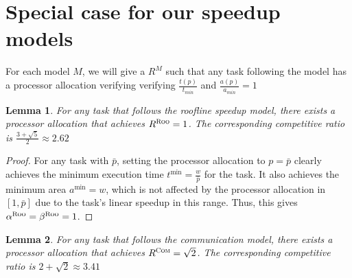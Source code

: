 \documentclass{article}
\newtheorem{lemma}{Lemma}
\newcommand\ratio{R\xspace}
\newcommand\ROO{\textsc{Roo}\xspace}
\newcommand\COM{\textsc{Com}\xspace}
\begin{document}
\section{Special case for our speedup models}

For each model $M$, we will give a $\ratio^M$ such that any task following the model has a processor allocation verifying verifying $\frac{t(p)}{t_{min}}$ and $\frac{a(p)}{a_{min}}=1$

\begin{lemma}\label{lem.roofline}
For any task that follows the roofline speedup model, there exists a processor allocation that achieves $R^{\ROO}=1$. The corresponding competitive ratio is $\frac{3+\sqrt{5}}{2} \approx 2.62$
\end{lemma}

\begin{proof}
For any task with $\bar{p}$, setting the processor allocation to $p = \bar{p}$ clearly achieves the minimum execution time $t^{\min} = \frac{w}{\bar{p}}$ for the task. It also achieves the minimum area $a^{\min} = w$, which is not affected by the processor allocation in $[1, \bar{p}]$ due to the task's linear speedup in this range.
Thus, this gives $\alpha^{\ROO} = \beta^{\ROO} = 1$.
\end{proof}


\begin{lemma}\label{lem.comm}
For any task that follows the communication model, there exists a processor allocation that achieves $R^{\COM}=\sqrt{2}$. The corresponding competitive ratio is $2+\sqrt{2} \approx 3.41$
\end{lemma}
\end{document}
